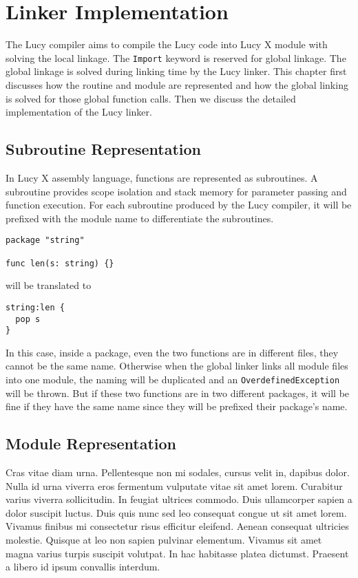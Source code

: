 \chapter{Linker Implementation}
The Lucy compiler aims to compile the Lucy code into Lucy X module with solving the local linkage. The \texttt{Import} keyword is reserved for global linkage. The global linkage is solved during linking time by the Lucy linker. This chapter first discusses how the routine and module are represented and how the global linking is solved for those global function calls. Then we discuss the detailed implementation of the Lucy linker.


\section{Subroutine Representation}
In Lucy X assembly language, functions are represented as subroutines. A subroutine provides scope isolation and stack memory for parameter passing and function execution. For each subroutine produced by the Lucy compiler, it will be prefixed with the module name to differentiate the subroutines.
\begin{lstlisting}
package "string"

func len(s: string) {}
\end{lstlisting}
will be translated to
\begin{lstlisting}[language=LucyX]
string:len {
  pop s
}
\end{lstlisting}
In this case, inside a package, even the two functions are in different files, they cannot be the same name. Otherwise when the global linker links all module files into one module, the naming will be duplicated and an \texttt{OverdefinedException} will be thrown. But if these two functions are in two different packages, it will be fine if they have the same name since they will be prefixed their package's name.

\section{Module Representation}
Cras vitae diam urna. Pellentesque non mi sodales, cursus velit in, dapibus dolor. Nulla id urna viverra eros fermentum vulputate vitae sit amet lorem. Curabitur varius viverra sollicitudin. In feugiat ultrices commodo. Duis ullamcorper sapien a dolor suscipit luctus. Duis quis nunc sed leo consequat congue ut sit amet lorem. Vivamus finibus mi consectetur risus efficitur eleifend. Aenean consequat ultricies molestie. Quisque at leo non sapien pulvinar elementum. Vivamus sit amet magna varius turpis suscipit volutpat. In hac habitasse platea dictumst. Praesent a libero id ipsum convallis interdum.


